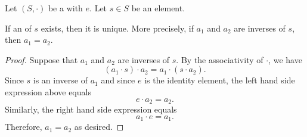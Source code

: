 \begin{lemma} \label{lemma:inverse_of_an_element_for_a_binary_operation_on_a_set_is_unique_if_exists}
    Let $(S,\cdot)$ be a  with  $e$. Let $s \in S$ be an element. 

    If an  of $s$ exists, then it is unique. More precisely, if $a_1$ and $a_2$ are inverses of $s$, then $a_1 = a_2$.
\end{lemma}
\begin{proof}
    Suppose that $a_1$ and $a_2$ are inverses of $s$. By the associativity of $\cdot$, we have 
    $$(a_1 \cdot s) \cdot a_2 = a_1 \cdot (s \cdot a_2).$$
    Since $s$ is an inverse of $a_1$ and since $e$ is the identity element, the left hand side expression above equals
    $$e \cdot a_2 = a_2.$$
    Similarly, the right hand side expression equals
    $$a_1 \cdot e = a_1.$$
    Therefore, $a_1 = a_2$ as desired.
\end{proof}